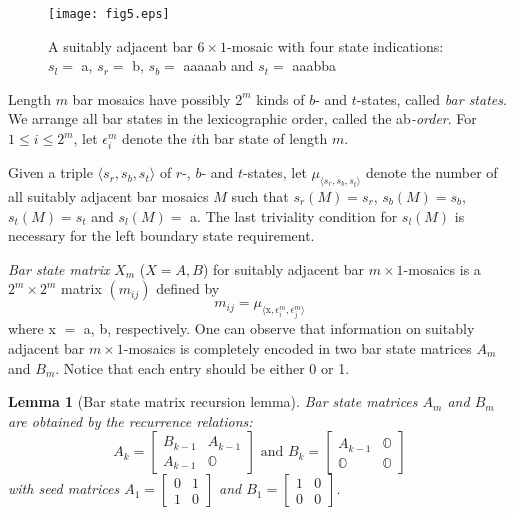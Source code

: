 \documentclass[11pt,a4paper]{amsart}
\newtheorem{lemma}[theorem]{Lemma}
\begin{document}
\begin{figure}[h]
\texttt{[image: fig5.eps]}
\caption{A suitably adjacent bar $6 \! \times \! 1$-mosaic with four state indications:
$s_l =$ a, $s_r =$ b, $s_b =$ aaaaab and $s_t =$ aaabba}
\label{fig:bar}
\end{figure}

Length $m$ bar mosaics have possibly $2^m$ kinds of $b$- and $t$-states, called {\em bar states\/}.
We arrange all bar states in the lexicographic order, called the ab{\em -order\/}.
For $1 \leq i \leq 2^m$, let $\epsilon^m_i$ denote the $i$th bar state of length $m$.
 
Given a triple $\langle s_r, s_b, s_t \rangle$ of $r$-, $b$- and $t$-states,
let $\mu_{\langle s_r, s_b, s_t \rangle}$ denote the number of all suitably adjacent bar mosaics $M$ such that 
$s_r(M) = s_r$, $s_b(M) = s_b$, $s_t(M) = s_t$ and $s_l(M)=$ a.
The last triviality condition for $s_l(M)$ is necessary for the left boundary state requirement.

{\em Bar state matrix\/} $X_m$ ($X = A, B$) for suitably adjacent bar $m \! \times \! 1$-mosaics 
is a $2^m \! \times \! 2^m$ matrix $(m_{ij})$ defined by  
$$ m_{ij} = \mu_{\langle \text{x}, \epsilon^m_i, \epsilon^m_j \rangle}$$
where x $\! =\!$ a, b, respectively.
One can observe that information on suitably adjacent bar $m \! \times \! 1$-mosaics is completely encoded 
in two bar state matrices $A_m$ and $B_m$.
Notice that each entry should be either 0 or 1.

\begin{lemma} [Bar state matrix recursion lemma] \label{lem:bar}
Bar state matrices $A_m$ and $B_m$ are obtained by the recurrence relations:
$$A_k = \begin{bmatrix} B_{k-1} & A_{k-1} \\ A_{k-1} & \mathbb{O} \end{bmatrix}
\mbox{ and } B_k = \begin{bmatrix} A_{k-1} & \mathbb{O} \\ \mathbb{O} & \mathbb{O} \end{bmatrix}$$
with seed matrices
$A_1 = \begin{bmatrix} 0 & 1 \\ 1 & 0 \end{bmatrix}$ and
$B_1 = \begin{bmatrix} 1 & 0 \\ 0 & 0 \end{bmatrix}$.
\end{lemma}
\end{document}
